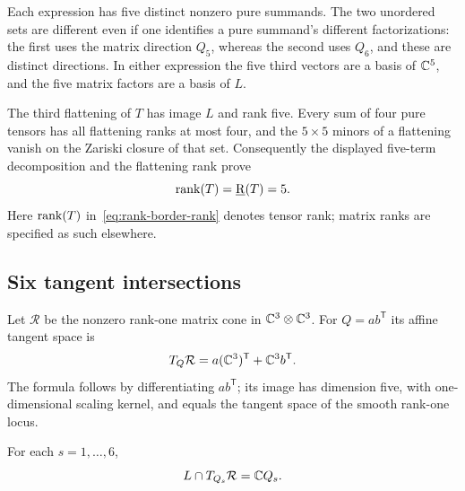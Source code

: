 Each expression has five distinct nonzero pure summands. The two
unordered sets are different even if one identifies a pure summand's
different factorizations: the first uses the matrix direction $Q_5$,
whereas the second uses $Q_6$, and these are distinct directions.
In either expression the five third vectors are a basis of $\mathbb C^5$,
and the five matrix factors are a basis of $L$.

The third flattening of $T$ has image $L$ and rank five. Every sum
of four pure tensors has all flattening ranks at most four, and the
$5\times5$ minors of a flattening vanish on the Zariski closure of
that set. Consequently the displayed five-term decomposition and
the flattening rank prove
\begin{equation}\label{eq:rank-border-rank}
 \operatorname{rank}(T)=\underline{\mathrm R}(T)=5.
\end{equation}
Here $\operatorname{rank}(T)$ in~\eqref{eq:rank-border-rank} denotes tensor rank;
matrix ranks are specified as such elsewhere.



\subsection{Six tangent intersections}

Let $\mathcal R$ be the nonzero rank-one matrix cone in
$\mathbb C^3\otimes\mathbb C^3$. For $Q=ab^{\mathsf T}$ its affine tangent space is
\begin{equation}\label{eq:matrix-tangent}
 T_Q\mathcal R=a(\mathbb C^3)^{\mathsf T}+\mathbb C^3 b^{\mathsf T}.
\end{equation}
The formula follows by differentiating $ab^{\mathsf T}$; its image
has dimension five, with one-dimensional scaling kernel, and equals
the tangent space of the smooth rank-one locus.

\begin{lemma}\label{lem:tangent-intersections}
For each $s=1,\ldots,6$,
\begin{equation}\label{eq:tangent-intersection}
 L\cap T_{Q_s}\mathcal R=\mathbb C Q_s.
\end{equation}
\end{lemma}

